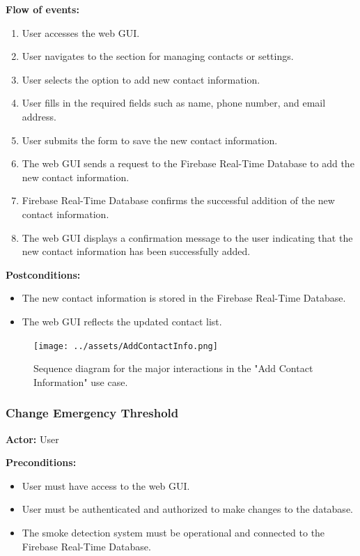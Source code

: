 \textbf{Flow of events:}
\begin{enumerate}
    \item User accesses the web GUI.
    \item User navigates to the section for managing contacts or settings.
    \item User selects the option to add new contact information.
    \item User fills in the required fields such as name, phone number, and email address.
    \item User submits the form to save the new contact information.
    \item The web GUI sends a request to the Firebase Real-Time Database to add the new contact information.
    \item Firebase Real-Time Database confirms the successful addition of the new contact information.
    \item The web GUI displays a confirmation message to the user indicating that the new contact information has been
          successfully added.
\end{enumerate}

\textbf{Postconditions:}
\begin{itemize}
    \item The new contact information is stored in the Firebase Real-Time Database.
    \item The web GUI reflects the updated contact list.
\end{itemize}

\begin{figure}[H]
    \centering
    \texttt{[image: ../assets/AddContactInfo.png]}
    \caption{Sequence diagram for the major interactions in the "Add Contact Information" use case.}
\end{figure}

\subsubsection{Change Emergency Threshold}

\textbf{Actor:} User

\textbf{Preconditions:}
\begin{itemize}
    \item User must have access to the web GUI.
    \item User must be authenticated and authorized to make changes to the database.
    \item The smoke detection system must be operational and connected to the Firebase Real-Time Database.
\end{itemize}

